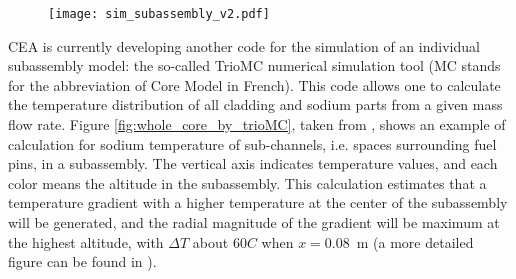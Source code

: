     \begin{figure}[htbp]
        \centerline{\texttt{[image: sim\_subassembly\_v2.pdf]}}
        \label{fig:sim_subassembly}
    \end{figure}
%
    CEA is currently developing another code for the simulation of an individual subassembly model: the so-called TrioMC numerical simulation tool
(MC stands for the abbreviation of Core Model in French). This code allows one to calculate the temperature distribution of all cladding and sodium parts from a given mass flow rate.
    Figure \ref{fig:whole_core_by_trioMC}, taken from \cite{Conti2015Numericalanalysisof}, shows an example of calculation for sodium temperature of
sub-channels, i.e. spaces surrounding fuel pins, in a subassembly. The vertical axis indicates temperature values, and each color means the altitude in the
subassembly. This calculation estimates that a temperature gradient with a higher temperature at the center of the subassembly will be generated, and the radial
magnitude of the gradient will be maximum at the highest altitude, with $\Delta T$ about \num{60}\textdegree{}$C$ when $x= $\SI{0.08}{\meter}
(a more detailed figure can be found in \cite{Conti2015Numericalanalysisof}).

